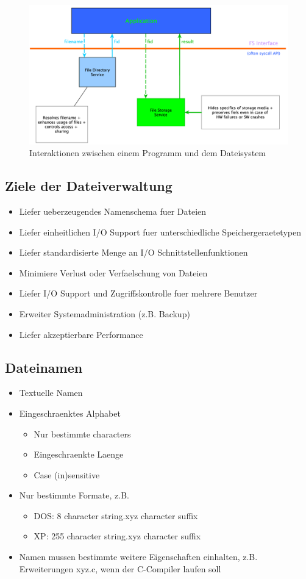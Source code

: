 \documentclass[a4paper]{scrreprt}
\begin{document}
\begin{figure}[ht]
\centering
\includegraphics[scale=0.4]{filesystem_interaction.png}
\caption{Interaktionen zwischen einem Programm und dem Dateisystem}
\end{figure}

\subsection{Ziele der Dateiverwaltung}
\begin{itemize}
	\item Liefer ueberzeugendes Namenschema fuer Dateien
	\item Liefer einheitlichen I/O Support fuer unterschiedliche Speichergeraetetypen
	\item Liefer standardisierte Menge an I/O Schnittstellenfunktionen
	\item Minimiere Verlust oder Verfaelschung von Dateien
	\item Liefer I/O Support und Zugriffskontrolle fuer mehrere Benutzer
	\item Erweiter Systemadministration (z.B. Backup)
	\item Liefer akzeptierbare Performance
\end{itemize}

\subsection{Dateinamen}
\begin{itemize}
	\item Textuelle Namen
	\item Eingeschraenktes Alphabet
		\begin{itemize}
			\item Nur bestimmte characters
			\item Eingeschraenkte Laenge
			\item Case (in)sensitive
		\end{itemize}
	\item Nur bestimmte Formate, z.B.
		\begin{itemize}
			\item DOS: 8 character string.xyz character suffix
			\item XP: 255 character string.xyz character suffix
		\end{itemize}
	\item Namen mussen bestimmte weitere Eigenschaften einhalten, z.B. Erweiterungen xyz.c, wenn der C-Compiler laufen soll
\end{itemize}
\end{document}
